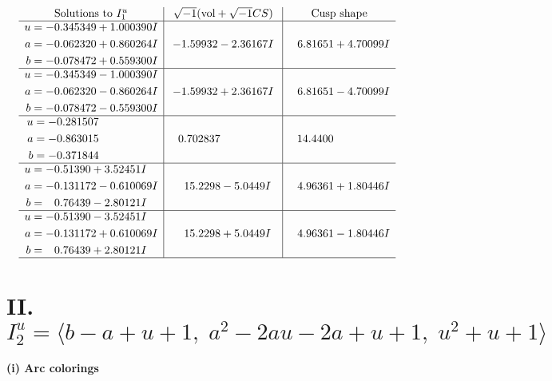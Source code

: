 \documentclass[1p]{elsarticle_modified}
\theoremstyle{definition}
\newcommand{\I}{\sqrt{-1}}
\begin{document}
$$\begin{array}{c|c|c}  
\text{Solutions to }I^u_{1}& \I (\text{vol} + \sqrt{-1}CS) & \text{Cusp shape}\\
 \hline 
\begin{aligned}
u &= -0.345349 + 1.000390 I \\
a &= -0.062320 + 0.860264 I \\
b &= -0.078472 + 0.559300 I\end{aligned}
 & -1.59932 - 2.36167 I & \phantom{-}6.81651 + 4.70099 I \\ \hline\begin{aligned}
u &= -0.345349 - 1.000390 I \\
a &= -0.062320 - 0.860264 I \\
b &= -0.078472 - 0.559300 I\end{aligned}
 & -1.59932 + 2.36167 I & \phantom{-}6.81651 - 4.70099 I \\ \hline\begin{aligned}
u &= -0.281507\phantom{ +0.000000I} \\
a &= -0.863015\phantom{ +0.000000I} \\
b &= -0.371844\phantom{ +0.000000I}\end{aligned}
 & \phantom{-}0.702837\phantom{ +0.000000I} & \phantom{-}14.4400\phantom{ +0.000000I} \\ \hline\begin{aligned}
u &= -0.51390 + 3.52451 I \\
a &= -0.131172 - 0.610069 I \\
b &= \phantom{-}0.76439 - 2.80121 I\end{aligned}
 & \phantom{-}15.2298 - 5.0449 I & \phantom{-}4.96361 + 1.80446 I \\ \hline\begin{aligned}
u &= -0.51390 - 3.52451 I \\
a &= -0.131172 + 0.610069 I \\
b &= \phantom{-}0.76439 + 2.80121 I\end{aligned}
 & \phantom{-}15.2298 + 5.0449 I & \phantom{-}4.96361 - 1.80446 I\\
 \hline 
 \end{array}$$\newpage\newpage\renewcommand{\arraystretch}{1}
\centering \section*{II. $I^u_{2}= \langle b- a+u+1,\;a^2-2 a u-2 a+u+1,\;u^2+u+1 \rangle$}
\flushleft \textbf{(i) Arc colorings}\\
\end{document}
